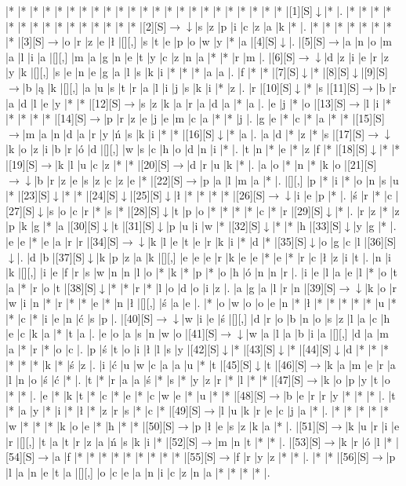 \documentclass[11pt]{article}
\newcommand\drarr{$\rightarrow \!\!\!\!\! \downarrow$}
\newcommand\rarr{$\rightarrow$}
\newcommand\darr{$\downarrow$}
\begin{document}
\noindent\begin{Puzzle}{24}{31}|*	|*	|*	|*	|*	|*	|*	|*	|*	|*	|*	|*	|*	|*	|*	|*	|*	|*	|*	|*	|*	|*	|*	|[1][S]\darr	|*	|.
|*	|*	|*	|*	|*	|*	|*	|*	|*	|*	|*	|*	|*	|*	|*	|[2][S]\drarr	|s	|z	|p	|i	|c	|z	|a	|k	|*	|.
|*	|*	|*	|*	|*	|*	|*	|*	|[3][S]\rarr	|o	|r	|z	|e	|ł	|[][,]{ }	|s	|t	|e	|p	|o	|w	|y	|*	|a	|[4][S]\darr	|.
|[5][S]\rarr	|a	|n	|o	|m	|a	|l	|i	|a	|[][,]{ }	|m	|a	|g	|n	|e	|t	|y	|c	|z	|n	|a	|*	|*	|r	|m	|.
|[6][S]\drarr	|d	|z	|i	|e	|r	|z	|y	|k	|[][,]{ }	|s	|e	|n	|e	|g	|a	|l	|s	|k	|i	|*	|*	|*	|a	|a	|.
|f	|*	|*	|[7][S]\darr	|*	|[8][S]\darr	|[9][S]\rarr	|b	|ą	|k	|[][,]{ }	|a	|u	|s	|t	|r	|a	|l	|i	|j	|s	|k	|i	|*	|z	|.
|r	|[10][S]\darr	|*	|s	|[11][S]\rarr	|b	|r	|a	|d	|l	|e	|y	|*	|*	|[12][S]\rarr	|s	|z	|k	|a	|r	|a	|d	|a	|*	|a	|.
|e	|j	|*	|o	|[13][S]\rarr	|l	|i	|*	|*	|*	|*	|*	|[14][S]\rarr	|p	|r	|z	|e	|j	|e	|m	|c	|a	|*	|*	|j	|.
|g	|e	|*	|c	|*	|a	|*	|*	|[15][S]\rarr	|m	|a	|n	|d	|a	|r	|y	|ń	|s	|k	|i	|*	|*	|[16][S]\darr	|*	|a	|.
|a	|d	|*	|z	|*	|s	|[17][S]\drarr	|k	|o	|z	|i	|b	|r	|ó	|d	|[][,]{ }	|w	|s	|c	|h	|o	|d	|n	|i	|*	|.
|t	|n	|*	|e	|*	|z	|f	|*	|[18][S]\darr	|*	|*	|[19][S]\rarr	|k	|l	|u	|c	|z	|*	|*	|[20][S]\rarr	|d	|r	|u	|k	|*	|.
|a	|o	|*	|n	|*	|k	|o	|[21][S]\drarr	|b	|r	|z	|e	|s	|z	|c	|z	|e	|*	|[22][S]\rarr	|p	|a	|l	|m	|a	|*	|.
|[][,]{ }	|p	|*	|i	|*	|o	|n	|s	|u	|*	|[23][S]\darr	|*	|*	|[24][S]\darr	|[25][S]\darr	|ł	|*	|*	|*	|*	|[26][S]\drarr	|i	|e	|p	|*	|.
|ś	|r	|*	|c	|[27][S]\darr	|s	|o	|c	|r	|*	|s	|*	|[28][S]\darr	|t	|p	|o	|*	|*	|*	|*	|c	|*	|r	|[29][S]\darr	|*	|.
|r	|z	|*	|z	|p	|k	|g	|*	|a	|[30][S]\darr	|t	|[31][S]\darr	|p	|u	|i	|w	|*	|[32][S]\darr	|*	|*	|h	|[33][S]\darr	|y	|g	|*	|.
|e	|e	|*	|e	|a	|r	|r	|[34][S]\drarr	|k	|l	|e	|t	|e	|r	|k	|i	|*	|d	|*	|[35][S]\darr	|o	|g	|c	|l	|[36][S]\darr	|.
|d	|b	|[37][S]\darr	|k	|p	|z	|a	|k	|[][,]{ }	|e	|e	|e	|r	|k	|e	|e	|*	|e	|*	|r	|c	|ł	|z	|i	|t	|.
|n	|i	|k	|[][,]{ }	|i	|e	|f	|r	|s	|w	|n	|n	|l	|o	|*	|k	|*	|p	|*	|o	|h	|ó	|n	|n	|r	|.
|i	|e	|l	|a	|e	|l	|*	|o	|t	|a	|*	|r	|o	|t	|[38][S]\darr	|*	|*	|r	|*	|l	|o	|d	|o	|i	|z	|.
|a	|g	|a	|l	|r	|n	|[39][S]\drarr	|k	|o	|r	|w	|i	|n	|*	|r	|*	|*	|e	|*	|n	|ł	|[][,]{ }	|ś	|a	|e	|.
|*	|o	|w	|o	|o	|e	|n	|*	|ł	|*	|*	|*	|*	|*	|u	|*	|*	|c	|*	|i	|e	|n	|ć	|s	|p	|.
|[40][S]\drarr	|w	|i	|e	|ś	|[][,]{ }	|d	|r	|o	|b	|n	|o	|s	|z	|l	|a	|c	|h	|e	|c	|k	|a	|*	|t	|a	|.
|e	|o	|a	|s	|n	|w	|o	|[41][S]\drarr	|w	|a	|l	|a	|b	|i	|a	|[][,]{ }	|d	|a	|m	|a	|*	|r	|*	|o	|c	|.
|p	|ś	|t	|o	|i	|ł	|l	|s	|y	|[42][S]\darr	|*	|[43][S]\darr	|*	|[44][S]\darr	|d	|*	|*	|*	|*	|*	|*	|k	|*	|ś	|z	|.
|i	|ć	|u	|w	|c	|a	|a	|u	|*	|t	|[45][S]\darr	|t	|[46][S]\rarr	|k	|a	|m	|e	|r	|a	|l	|n	|o	|ś	|ć	|*	|.
|t	|*	|r	|a	|a	|ś	|*	|s	|*	|y	|z	|r	|*	|l	|*	|*	|[47][S]\rarr	|k	|o	|p	|y	|t	|o	|*	|*	|.
|e	|*	|k	|t	|*	|c	|*	|e	|*	|c	|w	|e	|*	|u	|*	|*	|[48][S]\rarr	|b	|e	|r	|r	|y	|*	|*	|*	|.
|t	|*	|a	|y	|*	|i	|*	|ł	|*	|z	|r	|s	|*	|c	|*	|[49][S]\rarr	|l	|u	|k	|r	|e	|c	|j	|a	|*	|.
|*	|*	|*	|*	|*	|w	|*	|*	|*	|k	|o	|e	|*	|h	|*	|*	|[50][S]\rarr	|p	|ł	|e	|s	|z	|k	|a	|*	|.
|[51][S]\rarr	|k	|u	|r	|i	|e	|r	|[][,]{ }	|t	|a	|t	|r	|z	|a	|ń	|s	|k	|i	|*	|[52][S]\rarr	|m	|n	|t	|*	|*	|.
|[53][S]\rarr	|k	|r	|ó	|l	|*	|[54][S]\rarr	|a	|f	|*	|*	|*	|*	|*	|*	|*	|*	|*	|[55][S]\rarr	|f	|r	|y	|z	|*	|*	|.
|*	|*	|[56][S]\rarr	|p	|l	|a	|n	|e	|t	|a	|[][,]{ }	|o	|c	|e	|a	|n	|i	|c	|z	|n	|a	|*	|*	|*	|*	|.\end{Puzzle}
\end{document}

